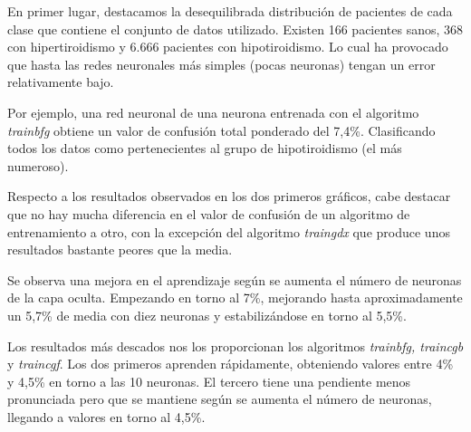 \documentclass[a4paper,12pt,titlepage]{article}
\begin{document}

\restoregeometry
\newpage

En primer lugar, destacamos la desequilibrada distribución de pacientes de cada clase que contiene el conjunto de datos utilizado. Existen 166 pacientes sanos, 368 con hipertiroidismo y 6.666 pacientes con hipotiroidismo. Lo cual ha provocado que hasta las redes neuronales más simples (pocas neuronas) tengan un error relativamente bajo. 

Por ejemplo, una red neuronal de una neurona entrenada con el algoritmo \textit{trainbfg} obtiene un valor de confusión total ponderado del 7,4\%. Clasificando todos los datos como pertenecientes al grupo de hipotiroidismo (el más numeroso).

Respecto a los resultados observados en los dos primeros gráficos, cabe destacar que no hay mucha diferencia en el valor de confusión de un algoritmo de entrenamiento a otro, con la excepción del algoritmo \textit{traingdx} que produce unos resultados bastante peores que la media. 

Se observa una mejora en el aprendizaje según se aumenta el número de neuronas de la capa oculta. Empezando en torno al 7\%, mejorando hasta aproximadamente un 5,7\% de media con diez neuronas y estabilizándose en torno al 5,5\%.

Los resultados más descados nos los proporcionan los algoritmos \textit{trainbfg, traincgb} y \textit{traincgf}. Los dos primeros aprenden rápidamente, obteniendo valores entre 4\% y 4,5\% en torno a las 10 neuronas. El tercero tiene una pendiente menos pronunciada pero que se mantiene según se aumenta el número de neuronas, llegando a valores en torno al 4,5\%.
\end{document}
